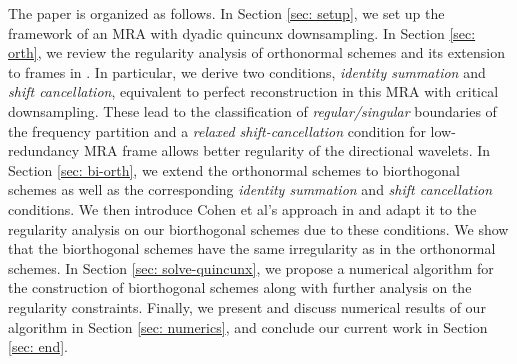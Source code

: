 The paper is organized as follows. In Section \ref{sec: setup}, we set up the framework of an MRA with dyadic quincunx downsampling. In Section \ref{sec: orth}, we review the regularity analysis of orthonormal schemes and its extension to frames in \cite{yin2014orthshear}. In particular, we derive two conditions, {\it identity summation} and {\it shift cancellation}, equivalent to perfect reconstruction in this MRA with critical downsampling. These lead to the classification of {\it regular/singular} boundaries of the frequency partition %
and a {\it relaxed shift-cancellation} condition for low-redundancy MRA frame allows better regularity of the directional wavelets. 
In Section \ref{sec: bi-orth}, we extend the orthonormal schemes to biorthogonal schemes as well as the corresponding {\it identity summation} and {\it shift cancellation} conditions. We then introduce Cohen et al's approach in \cite{cohen1993compactly} and adapt it to the regularity analysis on our biorthogonal schemes due to these conditions. We show that the biorthogonal schemes have the same irregularity as in the orthonormal schemes.
In Section \ref{sec: solve-quincunx}, we  propose a numerical algorithm for the construction of biorthogonal schemes along with further analysis on the regularity constraints.
Finally, we present and discuss numerical results of our algorithm in Section \ref{sec: numerics}, and conclude our current work in Section \ref{sec: end}.
